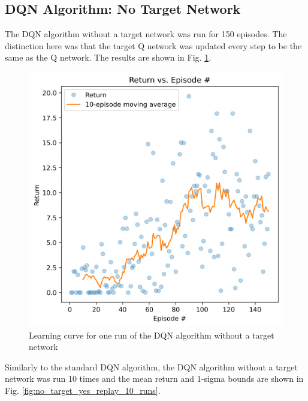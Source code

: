 \documentclass[conference]{IEEEtran}
\begin{document}
\subsection{DQN Algorithm: No Target Network}
The DQN algorithm without a target network was run for 150 episodes. The distinction here was that the target Q network was updated every step to be the same as the Q network. The results are shown in Fig. \ref{fig:no_target_yes_replay_one_run}.

\begin{figure}[h]
\centering
\includegraphics[width=0.87\linewidth]{../figures/no_target_yes_replay/return_150_1.png}
\caption{Learning curve for one run of the DQN algorithm without a target network}
\label{fig:no_target_yes_replay_one_run}
\end{figure}
Similarly to the standard DQN algorithm, the DQN algorithm without a target network was run 10 times and the mean return and 1-sigma bounds are shown in Fig. \ref{fig:no_target_yes_replay_10_runs}.
\end{document}
